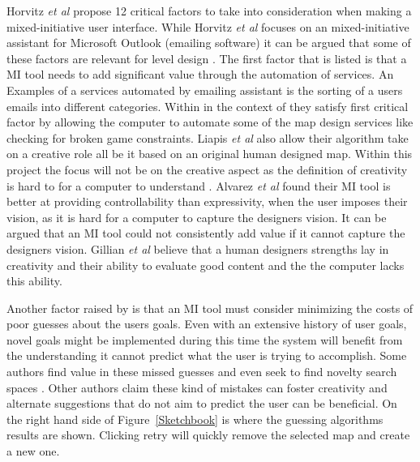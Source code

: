 \documentclass[journal]{IEEEtran}
\begin{document}
Horvitz \textit{et al} \cite{horvitz1999principles} propose 12 critical factors to take into consideration when making a mixed-initiative user interface. While Horvitz \textit{et al} \cite{horvitz1999principles}  focuses on an mixed-initiative assistant for Microsoft Outlook (emailing software) it can be argued that some of these factors are relevant for level design .  The first factor that is listed is that a MI tool needs to add significant value through the automation of services. An Examples of a services automated by emailing assistant is the sorting of a users emails into different categories.   Within in the context of \cite{liapis2013sentient}  they satisfy \cite{horvitz1999principles} first critical factor by allowing the computer to automate some of the map design services like checking for broken game constraints. Liapis \textit{et al} \cite{liapis2013sentient} also allow their algorithm take on a creative role all be it based on an original human designed map. Within this project the focus will not be on the creative aspect as the definition of creativity is hard to for a computer to understand \cite{jordanous2010defining}. Alvarez \textit{et al}\cite{alvarez2018fostering} found their MI tool is better at providing controllability than expressivity, when the user imposes their vision, as it is hard for a computer to capture the designers vision. It can be argued that an MI tool could not consistently add value if it cannot capture the designers vision. Gillian \textit{et al}\cite{smith2011tanagra} believe that a human designers strengths lay in creativity and their ability to evaluate good content and the the computer lacks this ability. 

Another factor raised by \cite{horvitz1999principles} is that an MI tool must consider minimizing the costs of poor guesses about the users goals. Even with an extensive history of user goals, novel goals might be implemented during this time the system will benefit from the understanding it cannot predict what the user is trying to accomplish.  Some authors find value in these missed guesses and even seek to find novelty search spaces \cite{liapis2013sentient}. Other authors \cite{liapis2016can,alvarez2018fostering, yannakakis2014mixed} claim these kind of mistakes can foster creativity and alternate suggestions that do not aim to predict the user can be beneficial. On the right hand side of Figure~\ref{Sketchbook} is where the guessing algorithms results are shown. Clicking retry will quickly remove the selected map and create a new one. 
\end{document}
